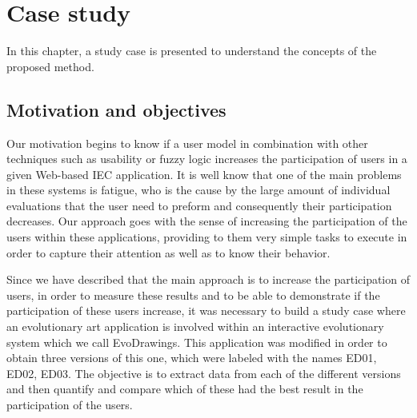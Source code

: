\chapter{Case study}

In this chapter, a study case is presented to understand the concepts of the
proposed method.

\section{Motivation and objectives}

Our motivation begins to know if a user model in combination with other
techniques such as usability or fuzzy logic increases the participation of users
in a given Web-based IEC application. It is well know that one of the main
problems in these systems is fatigue, who is the cause by the large amount of
individual evaluations that the user need to preform and consequently their
participation decreases.
Our approach goes with the sense of increasing the participation of the users
within these applications, providing to them very simple tasks to execute in order to
capture their attention as well as to know their behavior.


Since we have described that the main approach is to increase the participation
of users, in order to measure these results and to be able to demonstrate
if the participation
of these users increase, it was necessary to build a study
case where an evolutionary art application is involved within an interactive
evolutionary system which we call EvoDrawings. This application was modified in
order to obtain three versions of this one, which were labeled with the names
ED01, ED02, ED03. The objective is to extract data from each of the different
versions and then quantify and compare which of these had the best result in the
participation of the users.

